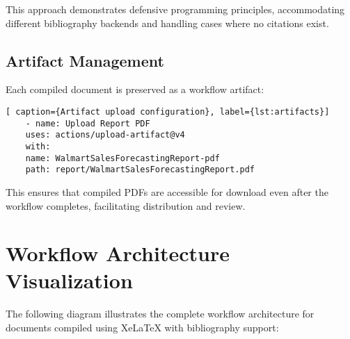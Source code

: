 This approach demonstrates defensive programming principles, accommodating different bibliography backends and handling cases where no citations exist.

\subsection{Artifact Management}

Each compiled document is preserved as a workflow artifact:

\begin{lstlisting}[breaklines=true][ caption={Artifact upload configuration}, label={lst:artifacts}]
	- name: Upload Report PDF
	uses: actions/upload-artifact@v4
	with:
	name: WalmartSalesForecastingReport-pdf
	path: report/WalmartSalesForecastingReport.pdf
\end{lstlisting}

This ensures that compiled PDFs are accessible for download even after the workflow completes, facilitating distribution and review.

\section{Workflow Architecture Visualization}
\label{sec:visualization}

The following diagram illustrates the complete workflow architecture for documents compiled using XeLaTeX with bibliography support:

